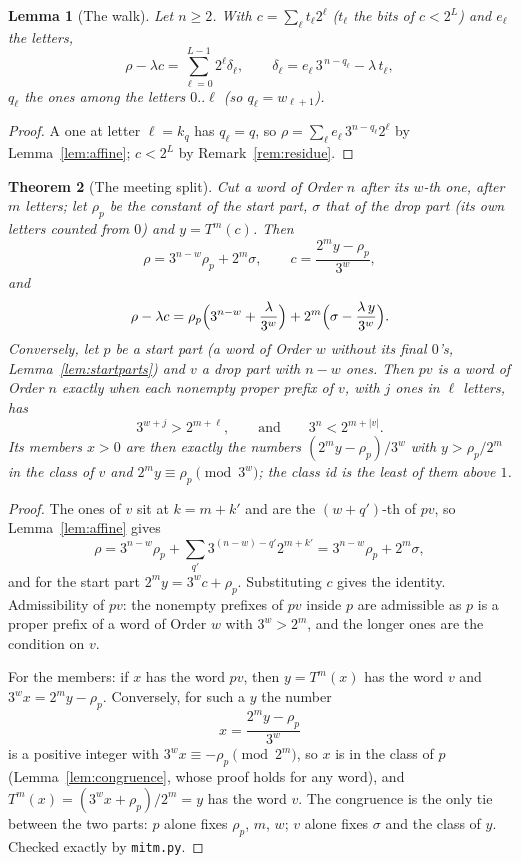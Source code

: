 \documentclass[10pt,a4paper,titlepage]{article}
\makeatletter
\newcommand{\termhere}[1]{\leavevmode
  \Hy@raisedlink{\hyper@anchorstart{term:#1}\hyper@anchorend}}
\theoremstyle{plain}
\newtheorem{theorem}{Theorem}[section]
\newtheorem{lemma}[theorem]{Lemma}
\theoremstyle{definition}
\theoremstyle{remark}
\makeatother
\begin{document}
\begin{lemma}[The walk]
\label{lem:walk}
\termhere{walk}Let $n \ge 2$. With $c = \sum_\ell t_\ell 2^\ell$ ($t_\ell$ the bits of $c < 2^L$) and $e_\ell$ the letters,
\[
\rho - \lambda c = \sum_{\ell=0}^{L-1} 2^\ell \delta_\ell,\qquad \delta_\ell = e_\ell\,3^{\,n-q_\ell} - \lambda\,t_\ell,
\]
$q_\ell$ the ones among the letters $0..\ell$ (so $q_\ell = w_{\ell+1}$).
\end{lemma}
\begin{proof}
A one at letter $\ell = k_q$ has $q_\ell = q$, so $\rho = \sum_\ell e_\ell\,3^{n-q_\ell}2^\ell$ by
Lemma~\ref{lem:affine}; $c < 2^L$ by Remark~\ref{rem:residue}.
\end{proof}

\begin{theorem}[The meeting split]
\label{thm:split}
\termhere{meetingsplit}Cut a word of Order $n$ after its $w$-th one, after $m$ letters; let $\rho_p$ be the constant of the start
part, $\sigma$ that of the drop part (its own letters counted from $0$) and $y = T^m(c)$. Then
\[
\rho = 3^{n-w}\rho_p + 2^m\sigma, \qquad c = \frac{2^m y - \rho_p}{3^w},
\]
and
\[
\rho - \lambda c = \rho_p\Bigl(3^{n-w} + \frac{\lambda}{3^w}\Bigr) + 2^m\Bigl(\sigma - \frac{\lambda\,y}{3^w}\Bigr).
\]
Conversely, let $p$ be a start part (a word of Order $w$ without its final $0$'s,
Lemma~\ref{lem:startparts}) and $v$ a drop part with $n - w$ ones. Then $pv$ is a word of Order $n$
exactly when each nonempty proper prefix of $v$, with $j$ ones in $\ell$ letters, has
\[
3^{w+j} > 2^{m+\ell}, \qquad\text{and}\qquad 3^n < 2^{m+|v|}.
\]
Its members $x > 0$ are then exactly the numbers
$(2^m y - \rho_p)/3^w$ with $y > \rho_p/2^m$ in the class of $v$ and $2^m y \equiv \rho_p \pmod{3^w}$;
the class id is the least of them above $1$.
\end{theorem}
\begin{proof}
The ones of $v$ sit at $k = m + k'$ and are the $(w+q')$-th of $pv$, so Lemma~\ref{lem:affine} gives
\[
\rho = 3^{n-w}\rho_p + \sum_{q'} 3^{(n-w)-q'}2^{m+k'} = 3^{n-w}\rho_p + 2^m\sigma,
\]
and for the start
part $2^m y = 3^w c + \rho_p$. Substituting $c$ gives the identity. Admissibility of $pv$: the nonempty
prefixes of $pv$ inside $p$ are admissible as $p$ is a proper prefix of a word of Order $w$ with
$3^w > 2^m$, and the longer ones are the condition on $v$.

For the members: if $x$ has the word $pv$,
then $y = T^m(x)$ has the word $v$ and $3^w x = 2^m y - \rho_p$. Conversely, for such a $y$ the number
\[
x = \frac{2^m y - \rho_p}{3^w}
\]
is a positive integer with $3^w x \equiv -\rho_p \pmod{2^m}$, so $x$ is in the
class of $p$ (Lemma~\ref{lem:congruence}, whose proof holds for any word), and
$T^m(x) = (3^w x + \rho_p)/2^m = y$ has the word $v$. The congruence is the only tie between the two
parts: $p$ alone fixes $\rho_p$, $m$, $w$; $v$ alone fixes $\sigma$ and the class of $y$.
Checked exactly by \texttt{mitm.py}.
\end{proof}
\end{document}
